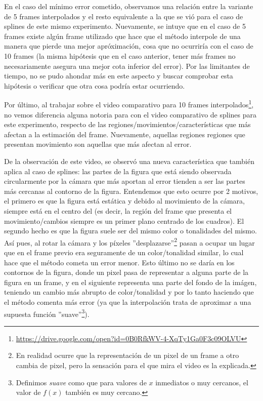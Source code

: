\par En el caso del m\'inimo error cometido, observamos una relaci\'on entre
la variante de 5 frames interpolados y el resto equivalente a la que se vi\'o
para el caso de splines de este mismo experimento. Nuevamente, se intuye que
en el caso de 5 frames existe alg\'un frame utilizado que hace que el m\'etodo
interpole de una manera que pierde una mejor apr\'oximaci\'on, cosa que no
ocurrir\'ia con el caso de 10 frames (la misma hip\'otesis que en el caso
anterior, tener m\'as frames no necesariamente asegura una mejor cota inferior
del error). Por las limitantes de tiempo, no se pudo ahondar m\'as en este
aspecto y buscar comprobar esta hip\'otesis o verificar que otra cosa podr\'ia
estar ocurriendo.

\par Por \'ultimo, al trabajar sobre el video comparativo para 10 frames
interpolados\footnote{\url{https://drive.google.com/open?id=0B0RfkWV-4-XqTy1Ga0F3c09OLVU}},
no vemos diferencia alguna notoria para con el video comparativo de splines
para este experimento, respecto de las regiones/movimientos/caracter\'isticas
que m\'as afectan a la estimaci\'on del frame. Nuevamente, aquellas regiones
regiones que presentan movimiento son aquellas que m\'as afectan al error.

\par De la observaci\'on de este video, se observ\'o una nueva caracter\'istica
que tambi\'en aplica al caso de splines: las partes de la figura que est\'a
siendo observada circularmente por la c\'amara que m\'as aportan al error
tienden a ser las partes m\'as cercanas al contorno de la figura. Entendemos
que esto ocurre por 2 motivos, el primero es que la figura est\'a est\'atica y
debido al movimiento de la c\'amara, siempre est\'a en el centro del (es decir,
la regi\'on del frame que presenta el movimiento/cambios siempre es un primer
plano centrado de los cuadros). El segundo hecho es que la figura suele ser del
mismo color o tonalidades del mismo. As\'i pues, al rotar la c\'amara y los
p\'ixeles ''desplazarse''\footnote{En realidad ocurre que la representaci\'on
de un pixel de un frame a otro cambia de pixel, pero la sensaci\'on para el que
mira el video es la explicada.} pasan a ocupar un lugar que en el frame previo
era seguramente de un color/tonalidad similar, lo cual hace que el m\'etodo
cometa un error menor.  Esto \'ultimo no se dar\'ia en los contornos de la
figura, donde un pixel pasa de representar a alguna parte de la figura en un
frame, y en el siguiente representa una parte del fondo de la im\'agen,
teniendo un cambio m\'as abrupto de color/tonalidad y por lo tanto haciendo que
el m\'etodo comenta m\'as error (ya que la interpolaci\'on trata de aproximar a
una supuesta funci\'on ''suave''\footnote{Definimos \emph{suave} como que para
valores de $x$ inmediatos o muy cercanos, el valor de $f(x)$ tambi\'en es muy
cercano.}).

